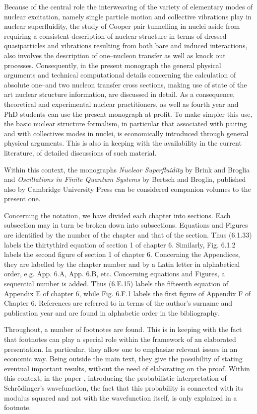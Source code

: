 Because of the central role the interweaving of the variety of elementary modes of nuclear excitation, namely single particle motion and collective vibrations play in nuclear superfluidity, the study of Cooper pair tunnelling in nuclei aside from requiring a consistent description of nuclear structure in terms of dressed quasiparticles and vibrations resulting from both bare and induced interactions, also involves  the description of one--nucleon transfer as well as knock out processes. Consequently, in the present monograph the general physical arguments and technical computational details concerning the   calculation of  absolute one--and two nucleon  transfer cross sections, making use of state of the art nuclear structure information, are discussed in detail. As a consequence, theoretical and experimental nuclear practitioners, as well as fourth year and PhD students can use the present monograph at profit. To make simpler this use, the basic nuclear structure formalism, in particular that associated with pairing and with collectives modes in nuclei, is economically introduced through general physical arguments. This is also in keeping with the availability in the current literature, of detailed discussions of such material.


 Within this context, the monographs \emph{Nuclear Superfluidity} by Brink and Broglia and \emph{Oscillations in Finite Quantum Systems}  by Bertsch and Broglia, published also by Cambridge University Press can be considered companion volumes to the present one.


Concerning the notation, we have divided each chapter into sections. Each subsection may in turn be broken down into subsections. Equations and Figures are identified by the number of the chapter and that of the section. Thus (6.1.33) labels the thirtythird equation of section 1 of chapter 6. Similarly, Fig. 6.1.2 labels the second figure of section 1 of chapter 6. Concerning the Appendices, they are labelled by the chapter number and by a Latin letter in alphabetical order, e.g. App. 6.A, App. 6.B, etc. Concerning equations and Figures, a sequential number is added. Thus (6.E.15) labels the fifteenth equation of Appendix E of chapter 6, while Fig. 6.F.1 labels the first figure of Appendix F of Chapter 6. References are referred to in terms of the author's surname and publication year and are found in alphabetic order in the bibliography.

Throughout, a number of footnotes are found. This is in keeping with the fact that footnotes can play a special role within the framework of an elaborated presentation. In particular, they allow one to emphasize relevant issues in an economic way. Being outside the main text, they give the possibility of stating eventual important results, without the need of elaborating on the proof. Within this context, in the paper  \cite{Born:26},  introducing the probabilistic interpretation of Schr\"odinger's  wavefunction, the fact that this probability is connected with its modulus squared and not with the wavefunction itself, is only explained in a footnote.



